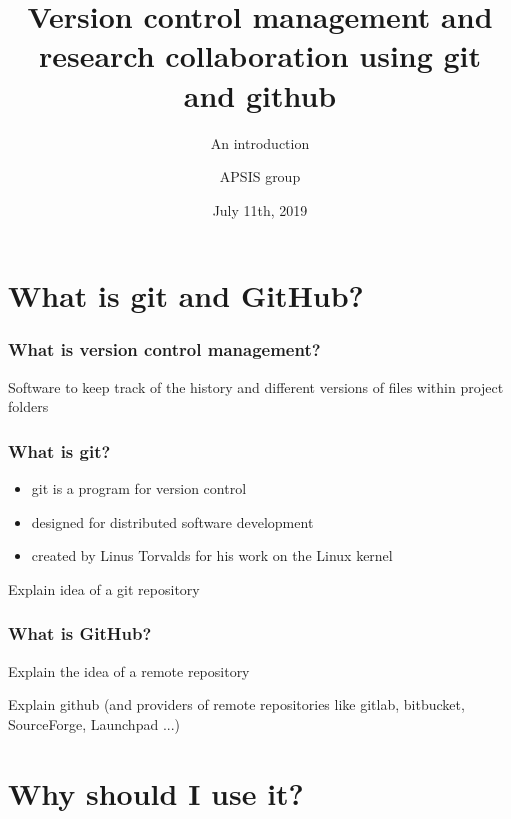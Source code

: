 \documentclass{beamer}
\title{Version control management and research collaboration using git and github}
\subtitle{An introduction}
\author{APSIS group}
\institute{MCC Berlin}
\date{July 11th, 2019}
\begin{document}
\maketitle


\section{What is git and GitHub?}

\begin{frame}
\frametitle{What is version control management?}

Software to keep track of the history and different versions of files within project folders

\end{frame}


\begin{frame}
\frametitle{What is git?}

\begin{itemize}
\item git is a program for version control

\item designed for distributed software development

\item created by Linus Torvalds for his work on the Linux kernel
\end{itemize}

Explain idea of a git repository

\end{frame}

\begin{frame}
\frametitle{What is GitHub?}

Explain the idea of a remote repository

Explain github (and providers of remote repositories like gitlab, bitbucket, SourceForge, Launchpad ...)

\end{frame}


\section{Why should I use it?}
\end{document}
